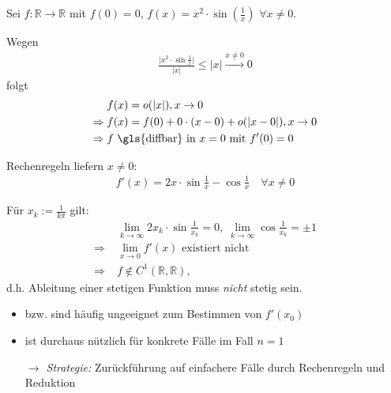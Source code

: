 \begin{example}
	Sei $f:\mathbb{R}\to \mathbb{R}$ mit $f(0) = 0$, $f(x)=x^2\cdot \sin\left(\frac{1}{x}\right)$ $\forall x\neq 0$.
	
	\begin{center}\end{center}
	
	Wegen \begin{align*}
		\frac{\vert x^2 \cdot \sin \frac{1}{x}\vert}{\vert x \vert} \le \vert x \vert \xrightarrow{x\neq 0} 0
	\end{align*}
	folgt{ \zeroAmsmathAlignVSpaces \begin{align*}
		& f(x) = o(\vert x \vert), x\to 0 \\
		\Rightarrow\;& f(x) = f(0) + 0\cdot (x - 0) + o(\vert x - 0\vert), x\to 0 \\
		\Rightarrow\;& f \text{  \gls{diffbar} in $x=0$ mit $f'(0) = 0$}
	\end{align*}}
	
	Rechenregeln liefern $x\neq 0$: \begin{align*}
		f'(x) = 2x\cdot\sin\frac{1}{x}- \cos\frac{1}{x} \quad\forall x\neq 0
	\end{align*}
	
	Für $x_k := \frac{1}{k\pi}$ gilt: \begin{align*}
		& \lim\limits_{k\to\infty} 2 x_k \cdot \sin \frac{1}{x_k} = 0,\; \lim\limits_{k\to\infty} \cos \frac{1}{x_k} = \pm 1 \\
		\Rightarrow\;& \lim\limits_{x\to 0} f'(x) \text{ existiert nicht} \\
		\Rightarrow\;& f\notin C^1(\mathbb{R}, \mathbb{R}),
	\end{align*}
	d.h. Ableitung einer stetigen Funktion muss \emph{nicht} stetig sein.
\end{example}

\begin{boldenvironment}
	\hspace{0pt}
\begin{itemize}[topsep=-2pt]
	\item {} bzw.  sind häufig ungeeignet zum Bestimmen von $f'(x_0)$
	\item {} ist durchaus nützlich für konkrete Fälle im Fall $n=1$
	
	\emph{$\rightarrow$ Strategie:} Zurückführung auf einfachere Fälle durch Rechenregeln und Reduktion
\end{itemize}
\end{boldenvironment}

